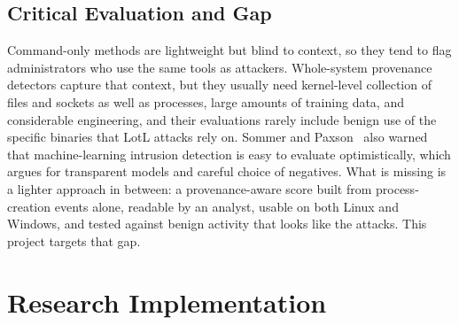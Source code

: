 \documentclass[conference]{IEEEtran}
\begin{document}
\subsection{Critical Evaluation and Gap}
Command-only methods are lightweight but blind to context, so they tend to
flag administrators who use the same tools as attackers. Whole-system
provenance detectors capture that context, but they usually need
kernel-level collection of files and sockets as well as processes, large
amounts of training data, and considerable engineering, and their
evaluations rarely include benign use of the specific binaries that LotL
attacks rely on. Sommer and Paxson~\cite{sommer2010outside} also warned that
machine-learning intrusion detection is easy to evaluate optimistically,
which argues for transparent models and careful choice of negatives. What is
missing is a lighter approach in between: a provenance-aware score built
from process-creation events alone, readable by an analyst, usable on both
Linux and Windows, and tested against benign activity that looks like the
attacks. This project targets that gap.

\section{Research Implementation}
\end{document}
